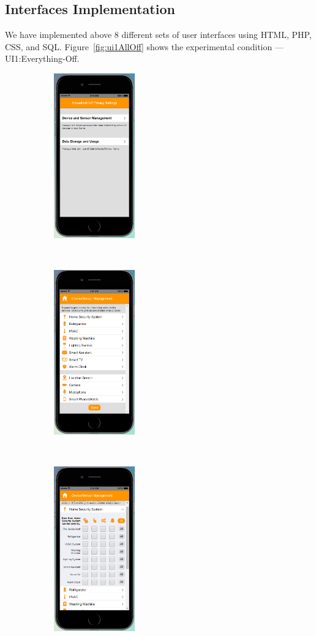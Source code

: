 \subsection{Interfaces Implementation}
We have implemented above 8 different sets of user interfaces using HTML, PHP, CSS, and SQL. Figure~\ref{fig:ui1AllOff} shows the experimental condition --- UI1:Everything-Off.
\begin{figure}
	\centering
	\begin{subfigure}[t]{0.24\textwidth}
		\centering
		\includegraphics[height=2.8in]{figures/ui1allOff1.png}
	\end{subfigure}%
	~
	\begin{subfigure}[t]{0.24\textwidth}
		\centering
		\includegraphics[height=2.8in]{figures/ui1allOff2.png}
	\end{subfigure}%
	~
	\begin{subfigure}[t]{0.24\textwidth}
		\centering
		\includegraphics[height=2.8in]{figures/ui2allOff3.png}

\end{subfigure}
\end{figure}
